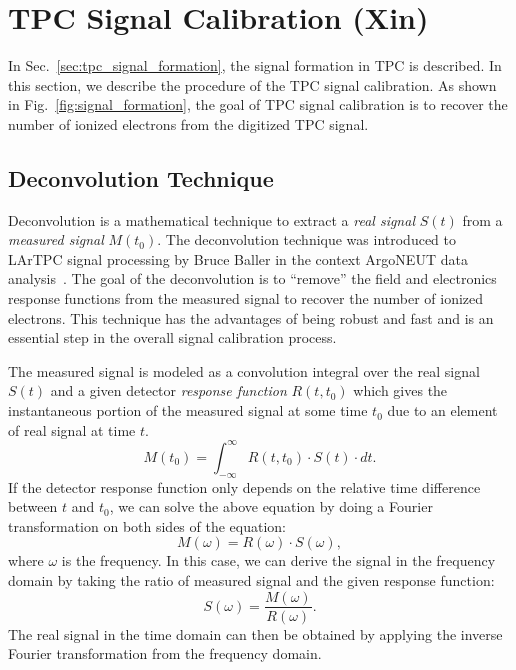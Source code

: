 \section{TPC Signal Calibration (Xin)}
\label{sec:tpc-signal-calibration}
In Sec.~\ref{sec:tpc_signal_formation}, the signal formation in TPC
is described. In this section, we describe the procedure of the TPC signal
calibration. As shown in Fig.~\ref{fig:signal_formation}, the goal of TPC 
signal calibration is to recover the number of ionized electrons from the 
digitized TPC signal. 

\subsection{Deconvolution Technique}\label{sec:decon}
Deconvolution is a mathematical technique to extract a \textit{real signal}
$S(t)$ from a \textit{measured signal} $M(t_0)$. 
The deconvolution technique was introduced to LArTPC signal processing by 
Bruce Baller in the context ArgoNEUT data analysis~\cite{bruce}. The goal of the 
deconvolution is to ``remove'' the field and electronics response functions 
from the measured signal to recover the number of ionized electrons. This 
technique has the advantages of being robust and fast and is an essential 
step in the overall signal calibration process. 

The measured signal is
modeled as a convolution integral over the real signal $S(t)$ and a
given detector \textit{response function} $R(t,t_0)$ which gives the
instantaneous portion of the measured signal at some time $t_0$ due to
an element of real signal at time $t$.
\begin{equation}\label{eq:decon_1}
M(t_0) = \int_{-\infty}^{\infty}  R(t,t_0) \cdot S(t) \cdot dt.
\end{equation}
If the detector response function only depends on the relative time 
difference between $t$ and $t_0$, we can solve the above equation by 
doing a Fourier transformation on both sides of the equation:
\begin{equation}
M(\omega) = R(\omega) \cdot S(\omega), 
\end{equation}
where $\omega$ is the frequency. In this case, we can derive the signal in the 
frequency domain by taking the ratio of measured signal and the given
response function:
\begin{equation}\label{eq:decon_2}
S(\omega) = \frac{M(\omega)}{R(\omega)}.
\end{equation}
The real signal in the time domain can then be obtained by applying the 
inverse Fourier transformation from the frequency domain. 

